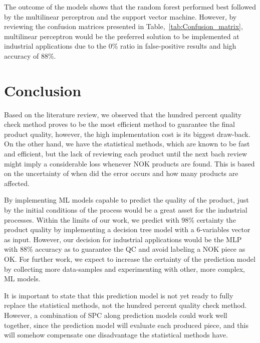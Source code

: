 \documentclass[5p,times,procedia]{elsarticle}
\begin{document}
The outcome of the models shows that the random forest performed best followed by the multilinear perceptron and the support vector machine. However, by reviewing the confusion matrices presented in Table,~\ref{tab:Confusion_matrix}, multilinear perceptron would be the preferred solution to be implemented at industrial applications due to the 0\% ratio in false-positive results and high accuracy of 88\%.

\section{Conclusion}


Based on the literature review, we observed that the hundred percent quality check method proves to be the most efficient method to guarantee the final product quality, however, the high implementation cost is its biggest draw-back. On the other hand, we have the statistical methods, which are known to be fast and efficient, but the lack of reviewing each product until the next bach review might imply a considerable loss whenever NOK products are found. This is based on the uncertainty of when did the error occurs and how many products are affected.

By implementing ML models capable to predict the quality of the product, just by the initial conditions of the process would be a great asset for the industrial processes. Within the limits of our work, we predict with 98\% certainty the product quality by implementing a decision tree model with a 6-variables vector as input. 
However, our decision for industrial applications would be the MLP with 88\% accuracy as to guarantee the QC and avoid labeling a NOK piece as OK. For further work, we expect to increase the certainty of the prediction model by collecting more data-samples and experimenting with other, more complex, ML models.

It is important to state that this prediction model is not yet ready to fully replace the statistical methods, not the hundred percent quality check method. However, a combination of SPC along prediction models could work well together, since the prediction model will evaluate each produced piece, and this will somehow compensate one disadvantage the statistical methods have.
\end{document}
